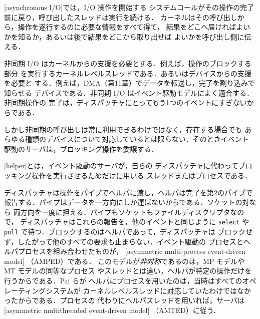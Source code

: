 \documentclass[../main.tex]{subfiles}
\begin{document}
\begin{definition}[非同期 I/O]
  [asynchronous I/O]では，I/O 操作を開始する
  システムコールがその操作の完了前に戻り，呼び出したスレッドは実行を続ける．
  カーネルはその呼び出しから，操作を遂行するのに必要な情報をすべて得て，
  結果をどこへ届ければよいかを知るか，あるいは後で結果をどこから取り出せば
  よいかを呼び出し側に伝える．
\end{definition}

非同期 I/O はカーネルからの支援を必要とする．例えば，操作のブロックする部分
を実行するカーネルレベルスレッドである．あるいはデバイスからの支援を必要と
する．例えば，DMA（第11章）でデータを転送し，完了を割り込みで知らせる
デバイスである．非同期 I/O はイベント駆動モデルによく適合する．非同期操作の
完了は，ディスパッチャにとってもう1つのイベントにすぎないからである．

しかし非同期の呼び出しは常に利用できるわけではなく，存在する場合でも
あらゆる種類のデバイスについて対応しているとは限らない．そのときイベント
駆動のサーバは，ブロッキング操作を委譲する．

\begin{definition}[ヘルパ]
  [helper]とは，イベント駆動のサーバが，自らの
  ディスパッチャに代わってブロッキング操作を実行させるためだけに用いる
  スレッドまたはプロセスである．
\end{definition}

ディスパッチャは操作をパイプでヘルパに渡し，ヘルパは完了を第2のパイプで
報告する．パイプはデータを一方向にしか運ばないからである．ソケットの対なら
両方向を一度に担える．パイプもソケットもファイルディスクリプタなので，
ディスパッチャはこれらの報告を，他のイベントと同じように \texttt{select}
や \texttt{poll} で待つ．ブロックするのはヘルパであって，ディスパッチャは
ブロックせず，したがって他のすべての要求も止まらない．イベント駆動の
プロセスとヘルパプロセスを組み合わせたものが，
[asymmetric multi-process event-driven model]%
（AMPED）である．
このモデルが\emph{非対称}であるのは，MP モデルや MT モデルの同等なプロセス
やスレッドとは違い，ヘルパが特定の操作だけを行うからである．Pai らが
ヘルパにプロセスを用いたのは，当時はすべてのオペレーティングシステムが
カーネルレベルスレッドに対応していたわけではなかったからである．プロセスの
代わりにヘルパスレッドを用いれば，サーバは
[asymmetric multithreaded event-driven model]%
（AMTED）に従う．
\end{document}
